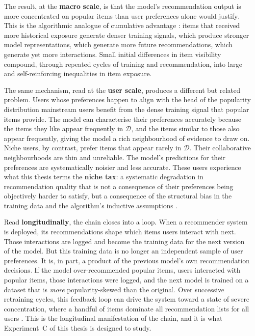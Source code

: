 \documentclass[11pt,a4paper]{report}
\begin{document}
The result, at the \textbf{macro scale}, is that the model's recommendation output is more concentrated on popular items than user preferences alone would justify. This is the algorithmic analogue of cumulative advantage \citep{merton1968social}: items that received more historical exposure generate denser training signals, which produce stronger model representations, which generate more future recommendations, which generate yet more interactions. Small initial differences in item visibility compound, through repeated cycles of training and recommendation, into large and self-reinforcing inequalities in item exposure.

The same mechanism, read at the \textbf{user scale}, produces a different but related problem. Users whose preferences happen to align with the head of the popularity distribution mainstream users benefit from the dense training signal that popular items provide. The model can characterise their preferences accurately because the items they like appear frequently in $\mathcal{D}$, and the items similar to those also appear frequently, giving the model a rich neighbourhood of evidence to draw on. Niche users, by contrast, prefer items that appear rarely in $\mathcal{D}$. Their collaborative neighbourhoods are thin and unreliable. The model's predictions for their preferences are systematically noisier and less accurate. These users experience what this thesis terms the \textbf{niche tax}: a systematic degradation in recommendation quality that is not a consequence of their preferences being objectively harder to satisfy, but a consequence of the structural bias in the training data and the algorithm's inductive assumptions \citep{abdollahpouri2021usercentered, leonhardt2018userfairness}.

Read \textbf{longitudinally}, the chain closes into a loop. When a recommender system is deployed, its recommendations shape which items users interact with next. Those interactions are logged and become the training data for the next version of the model. But this training data is no longer an independent sample of user preferences. It is, in part, a product of the previous model's own recommendation decisions. If the model over-recommended popular items, users interacted with popular items, those interactions were logged, and the next model is trained on a dataset that is \emph{more} popularity-skewed than the original. Over successive retraining cycles, this feedback loop can drive the system toward a state of severe concentration, where a handful of items dominate all recommendation lists for all users \citep{chaney2018algorithmic, mansoury2020feedback}. This is the longitudinal manifestation of the chain, and it is what Experiment~C of this thesis is designed to study.
\end{document}

